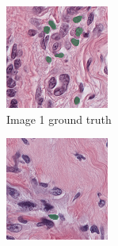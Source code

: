 \begin{figure}[H]
  \begin{subfigure}[b]{0.32\textwidth}
    \centering
    \includegraphics[width=\linewidth]{assets/images/for_presentation/exp2-2-gt.png}
    \caption{Image 1 ground truth}
  \end{subfigure}\hfill
  \begin{subfigure}[b]{0.32\textwidth}
    \centering
    \includegraphics[width=\linewidth]{assets/images/for_presentation/exp2-1-gt.png}

\end{subfigure}
\end{figure}

